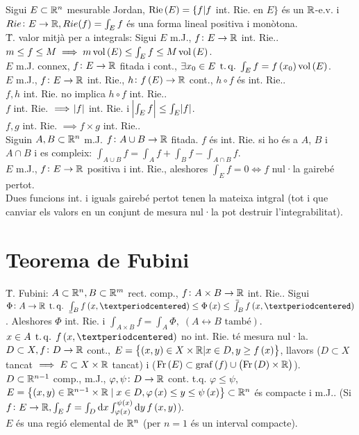 \ci Sigui $E\subset\mathbb{R}^n$ mesurable Jordan, $\operatorname{Rie}\left( E \right) = \{f | f$ int. Rie. en $E \}$ és un $\mathbb{R}$-e.v. i $Rie\colon E \to \mathbb{R}, Rie(f) = \int_E f$ és una forma lineal positiva i monòtona. \\
\u{T. valor mitjà per a integrals}: Sigui $E$ m.J., $f\colon E\to\mathbb{R}$ int. Rie.. $m\leq f\leq M \implies m\operatorname{vol}\left( E \right)\leq \int_E f\leq M\operatorname{vol}\left( E \right)$. \\
\ci $E$ m.J. connex, $f\colon E\to\mathbb{R}$ fitada i cont., $\exists x_0 \in E \operatorname{\;t.q.\;} \int_E f = f\left( x_0 \right)\operatorname{vol}\left( E \right)$. \\
\ci $E$ m.J., $f\colon E\to \mathbb{R}$ int. Rie., $h \colon f\left( E \right) \to \mathbb{R}$ cont., $h\circ f$ és int. Rie.. \\
\ci $f, h$ int. Rie. no implica $h\circ f$ int. Rie.. \\
\ci $f$ int. Rie. $\implies \abs{f}$ int. Rie. i $\abs{\int_E f} \leq \int_E \abs{f}$. \\
\ci $f, g$ int. Rie. $\implies f\times g$ int. Rie.. \\
\ci Siguin $A,B\subset\mathbb{R}^n$ m.J. $f\colon A\cup B\to \mathbb{R}$ fitada. $f$ és int. Rie. si ho és a $A$, $B$ i $A\cap B$  i es compleix: $\int_{A\cup B} f= \int_A f + \int_B f - \int_{A\cap B} f$. \\
\ci $E$ m.J., $f\colon E \to \mathbb{R}$ positiva i int. Rie., aleshores $\int_E f=0 \iff f$ nul·la gairebé pertot. \\
\ci Dues funcions int. i iguals gairebé pertot tenen la mateixa intgral (tot i que canviar els valors en un conjunt de mesura nul·la pot destruir l'integrabilitat).

\section{Teorema de Fubini}

\u{T. Fubini}: $A\subset\mathbb{R}^n, B \subset \mathbb{R}^m$ rect. comp., $f\colon A\times B \to \mathbb{R}$ int. Rie.. Sigui $\Phi\colon A\to\real \tq \lowint_B f\left( x,· \right) \leq \Phi\left( x \right) \leq \upint_B f\left( x, · \right)$. Aleshores $\Phi$ int. Rie. i $\int_{A\times B} f = \int_A \Phi,\; \left( A \leftrightarrow B \text{ també}\right)$. \\
\ci $x \in A \tq f\left( x, · \right)$ no int. Rie. té mesura nul·la. \\
\ci $D\subset X, f\colon D\to \mathbb{R}$ cont., $E = \left\{ \left( x, y  \right)\in X\times \mathbb{R} | x\in D, y \geq f\left( x \right) \right\}$, llavors ($D\subset X$ tancat $\implies E\subset X\times\mathbb{R}$ tancat) i ($\operatorname{Fr}\left( E \right) \subset \operatorname{graf}\left( f \right) \cup \left( \operatorname{Fr}\left( D \right)\times \mathbb{R}  \right)$). \\
\ci $D\subset \mathbb{R}^{n-1}$ comp., m.J., $\varphi, \psi\colon D\to \mathbb{R}$ cont. t.q. $\varphi \leq \psi$, $E = \left\{ \left( x,y \right)\in\mathbb{R}^{n-1}\times \mathbb{R}\;|\; x\in D, \varphi\left( x \right) \leq y \leq \psi\left( x \right) \right\} \subset \mathbb{R}^n$ és compacte i m.J.. (Si $f\colon E\to \real, \int_E f = \int_D \dif x\int_{\varphi\left( x \right)}^{\psi\left( x \right)}\dif y\, f\left( x, y \right)$). \\
\ci $E$ és una regió elemental de $\mathbb{R}^n$ (per $n=1$ és un interval compacte).

